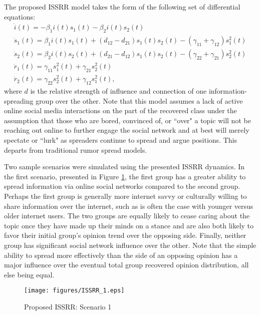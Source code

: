The proposed ISSRR model takes the form of the following set of differential equations:
\begin{equation}\label{eqn:ISSRR_dynamics}
\left.\begin{aligned}
\dot{i}(t) = -\beta_1 i(t)s_1(t) - \beta_2 i(t)s_2(t)\\
\dot{s}_1(t) = \beta_1 i(t)s_1(t) + (d_{12}-d_{21})s_1(t)s_2(t) - (\gamma_{11}+ \gamma_{12})s_1^2(t)\\
\dot{s}_2(t) = \beta_2 i(t)s_2(t) + (d_{21}-d_{12})s_1(t)s_2(t) - (\gamma_{22}+ \gamma_{21})s_2^2(t)\\
\dot{r}_1(t) = \gamma_{11}s_1^2(t) + \gamma_{21} s_2^2(t)\\
\dot{r}_2(t) = \gamma_{22}s_2^2(t) + \gamma_{12} s_1^2(t),
\end{aligned}\right.
\end{equation}
\noindent where $d$ is the relative strength of influence and connection of one information-spreading group over the other. Note that this model assumes a lack of active online social media interactions on the part of the recovered class under the assumption that those who are bored, convinced of, or ``over" a topic will not be reaching out online to further engage the social network and at best will merely spectate or ``lurk" as spreaders continue to spread and argue positions. This departs from traditional rumor spread models.

Two sample scenarios were simulated using the presented ISSRR dynamics. In the first scenario, presented in Figure \ref{fig:ISSRR_1}, the first group has a greater ability to spread information via online social networks compared to the second group. Perhaps the first group is generally more internet savvy or culturally willing to share information over the internet, such as is often the case with younger versus older internet users. The two groups are equally likely to cease caring about the topic once they have made up their minds on a stance and are also both likely to favor their initial group's opinion trend over the opposing side. Finally, neither group has significant social network influence over the other. Note that the simple ability to spread more effectively than the side of an opposing opinion has a major influence over the eventual total group recovered opinion distribution, all else being equal.

\begin{figure}[!htbp] \centering
  \texttt{[image: figures/ISSRR\_1.eps]}
  \caption{Proposed ISSRR: Scenario 1}
  \label{fig:ISSRR_1}
\end{figure}

